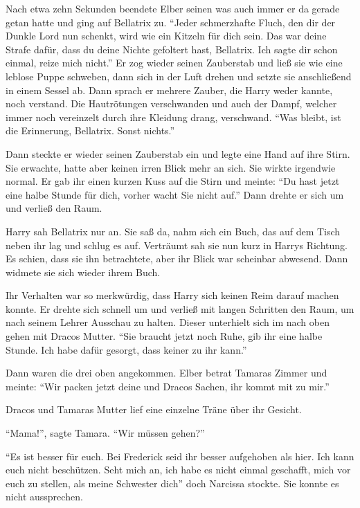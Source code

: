 Nach etwa zehn Sekunden beendete Elber seinen \gst was auch immer er da gerade getan hatte \gst und ging auf Bellatrix zu. \enquote{Jeder schmerzhafte Fluch, den dir der Dunkle Lord nun schenkt, wird wie ein Kitzeln für dich sein. Das war deine Strafe dafür, dass du deine Nichte gefoltert hast, Bellatrix. Ich sagte dir schon einmal, reize mich nicht.} Er zog wieder seinen Zauberstab und ließ sie wie eine leblose Puppe schweben, dann sich in der Luft drehen und setzte sie anschließend in einem Sessel ab. Dann sprach er mehrere Zauber, die Harry weder kannte, noch verstand. Die Hautrötungen verschwanden und auch der Dampf, welcher immer noch vereinzelt durch ihre Kleidung drang, verschwand. \enquote{Was bleibt, ist die Erinnerung, Bellatrix. Sonst nichts.}

Dann steckte er wieder seinen Zauberstab ein und legte eine Hand auf ihre Stirn. Sie erwachte, hatte aber keinen irren Blick mehr an sich. Sie wirkte irgendwie normal. Er gab ihr einen kurzen Kuss auf die Stirn und meinte: \enquote{Du hast jetzt eine halbe Stunde für dich, vorher wacht Sie nicht auf.} Dann drehte er sich um und verließ den Raum.

Harry sah Bellatrix nur an. Sie saß da, nahm sich ein Buch, das auf dem Tisch neben ihr lag und schlug es auf. Verträumt sah sie nun kurz in Harrys Richtung. Es schien, dass sie ihn betrachtete, aber ihr Blick war scheinbar abwesend. Dann widmete sie sich wieder ihrem Buch.

Ihr Verhalten war so merkwürdig, dass Harry sich keinen Reim darauf machen konnte. Er drehte sich schnell um und verließ mit langen Schritten den Raum, um nach seinem Lehrer Ausschau zu halten. Dieser unterhielt sich im nach oben gehen mit Dracos Mutter. \enquote{Sie braucht jetzt noch Ruhe, gib ihr eine halbe Stunde. Ich habe dafür gesorgt, dass keiner zu ihr kann.}

Dann waren die drei oben angekommen. Elber betrat Tamaras Zimmer und meinte: \enquote{Wir packen jetzt deine und Dracos Sachen, ihr kommt mit zu mir.}

Dracos und Tamaras Mutter lief eine einzelne Träne über ihr Gesicht.

\enquote{Mama!}, sagte Tamara. \enquote{Wir müssen gehen?}

\enquote{Es ist besser für euch. Bei Frederick seid ihr besser aufgehoben als hier. Ich kann euch nicht beschützen. Seht mich an, ich habe es nicht einmal geschafft, mich vor euch zu stellen, als meine Schwester dich\abs} doch Narcissa stockte. Sie konnte es nicht aussprechen.

